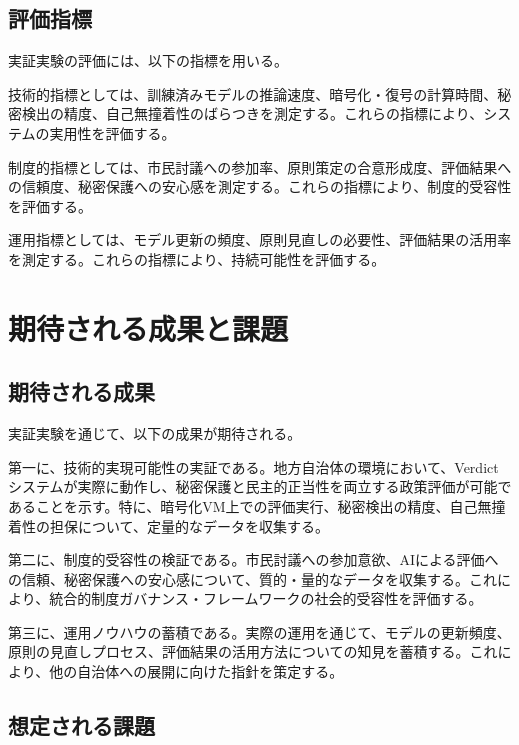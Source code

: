 \subsection{評価指標}

実証実験の評価には、以下の指標を用いる。

技術的指標としては、訓練済みモデルの推論速度、暗号化・復号の計算時間、秘密検出の精度、自己無撞着性のばらつきを測定する。これらの指標により、システムの実用性を評価する。

制度的指標としては、市民討議への参加率、原則策定の合意形成度、評価結果への信頼度、秘密保護への安心感を測定する。これらの指標により、制度的受容性を評価する。

運用指標としては、モデル更新の頻度、原則見直しの必要性、評価結果の活用率を測定する。これらの指標により、持続可能性を評価する。

\section{期待される成果と課題}
\label{sec:ch_integrated_expected}

\subsection{期待される成果}

実証実験を通じて、以下の成果が期待される。

第一に、技術的実現可能性の実証である。地方自治体の環境において、Verdictシステムが実際に動作し、秘密保護と民主的正当性を両立する政策評価が可能であることを示す。特に、暗号化VM上での評価実行、秘密検出の精度、自己無撞着性の担保について、定量的なデータを収集する。

第二に、制度的受容性の検証である。市民討議への参加意欲、AIによる評価への信頼、秘密保護への安心感について、質的・量的なデータを収集する。これにより、統合的制度ガバナンス・フレームワークの社会的受容性を評価する。

第三に、運用ノウハウの蓄積である。実際の運用を通じて、モデルの更新頻度、原則の見直しプロセス、評価結果の活用方法についての知見を蓄積する。これにより、他の自治体への展開に向けた指針を策定する。

\subsection{想定される課題}

